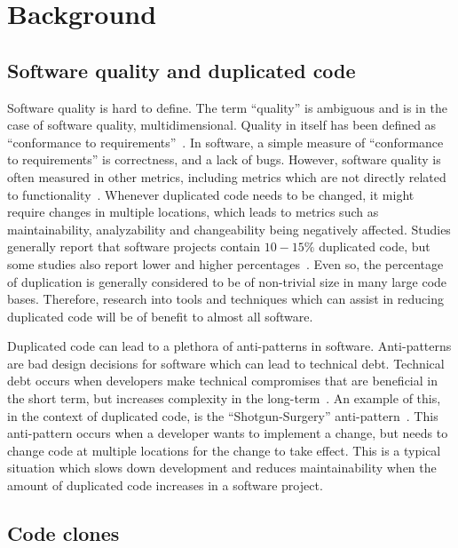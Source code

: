 \chapter{Background}

\section{Software quality and duplicated code}

Software quality is hard to define. The term ``quality'' is ambiguous and is in the case
of software quality, multidimensional. Quality in itself has been defined as ``conformance
to requirements''~\cite[8]{crosby1980quality}. In software, a simple measure of
``conformance to requirements'' is correctness, and a lack of bugs. However, software
quality is often measured in other metrics, including metrics which are not directly
related to functionality~\cite[29]{MetricsAndModelsInSoftwareQuality}. Whenever duplicated
code needs to be changed, it might require changes in multiple locations, which leads to
metrics such as maintainability, analyzability and changeability being negatively
affected. Studies generally report that software projects contain $10-15\%$ duplicated
code, but some studies also report lower and higher percentages~\cite{CloningByAccident}.
Even so, the percentage of duplication is generally considered to be of non-trivial size
in many large code bases. Therefore, research into tools and techniques which can assist
in reducing duplicated code will be of benefit to almost all software.

Duplicated code can lead to a plethora of anti-patterns in software. Anti-patterns are bad
design decisions for software which can lead to technical debt. Technical debt occurs when
developers make technical compromises that are beneficial in the short term, but increases
complexity in the long-term~\cite[111]{TechnicalDebt}. An example of this, in the context
of duplicated code, is the ``Shotgun-Surgery'' anti-pattern~\cite[66]{fowlerrefactoring}.
This anti-pattern occurs when a developer wants to implement a change, but needs to change
code at multiple locations for the change to take effect. This is a typical situation
which slows down development and reduces maintainability when the amount of duplicated
code increases in a software project.

\section{Code clones}

